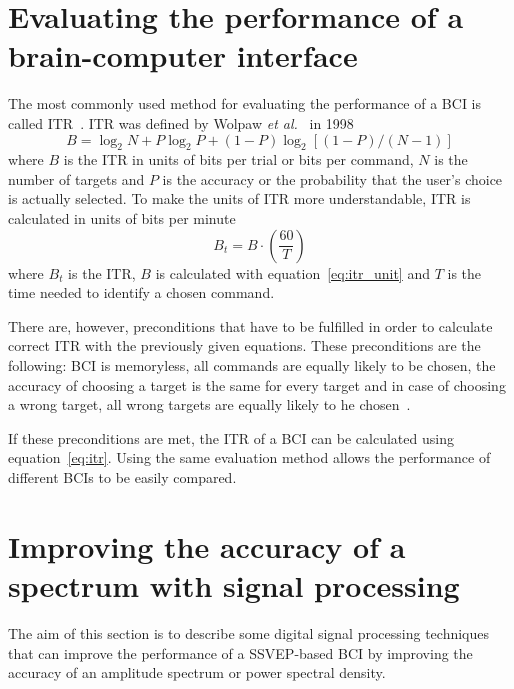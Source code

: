 
\section{Evaluating the performance of a brain-computer interface}

The most commonly used method for evaluating the performance of a \gls{BCI} is called \gls{ITR}~\cite{itr}. \gls{ITR} was defined by Wolpaw \textit{et al.}~\cite{itr_wolpaw} in 1998
\begin{equation}
	\label{eq:itr_unit}
	B=\log_2 N+ P\log_2 P +(1-P)\log_2[(1-P)/(N-1)]
\end{equation}
where $B$ is the \gls{ITR} in units of bits per trial or bits per command, $N$ is the number of targets and $P$ is the accuracy or the probability that the user's choice is actually selected. To make the units of \gls{ITR} more understandable, \gls{ITR} is calculated in units of bits per minute~\cite{itr_wolpaw}
\begin{equation}
	\label{eq:itr}
	B_t=B\cdot(\frac{60}{T})
\end{equation}
where $B_t$ is the \gls{ITR}, $B$ is calculated with equation~\ref{eq:itr_unit} and $T$ is the time needed to identify a chosen command.

There are, however, preconditions that have to be fulfilled in order to calculate correct \gls{ITR} with the previously given equations. These preconditions are the following: \gls{BCI} is memoryless, all commands are equally likely to be chosen, the accuracy of choosing a target is the same for every target and in case of choosing a wrong target, all wrong targets are equally likely to he chosen~\cite{itr}.

If these preconditions are met, the \gls{ITR} of a \gls{BCI} can be calculated using equation~\ref{eq:itr}. Using the same evaluation method allows the performance of different \glspl{BCI} to be easily compared.

\section{Improving the accuracy of a spectrum with signal processing}
\label{sec:signal_processing}

The aim of this section is to describe some digital signal processing techniques that can improve the performance of a \gls{SSVEP}-based \gls{BCI} by improving the accuracy of an amplitude spectrum or \gls{power spectral density}.

